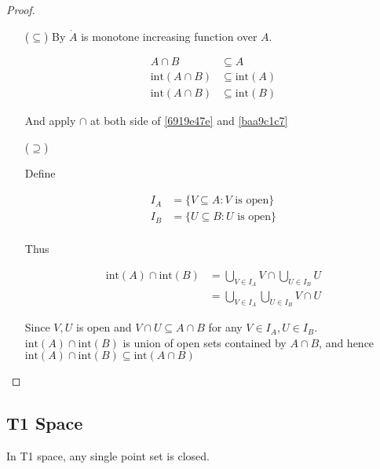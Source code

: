 \begin{proof}
    \:

   \begin{enumerate}
    \item [($\subseteq$)] By $\mathring{A}$ is monotone increasing function over $A$.
    
    \begin{align}
        A \cap B & \subseteq A \\
        \mathrm{int}(A \cap B) & \subseteq \mathrm{int}(A) \label{6919e47e} \\
        \mathrm{int}(A \cap B) & \subseteq \mathrm{int}(B) \label{baa9c1c7}
    \end{align}

    And apply $\cap$ at both side of \eqref{6919e47e} and \eqref{baa9c1c7}

    \item [($\supseteq$)]

    Define

    \begin{align*}
        I_A &= \{V \subseteq A: V \text{ is open} \} \\
        I_B &= \{U \subseteq B: U \text{ is open} \} \\
    \end{align*}

    Thus

    \begin{align*}
        \mathrm{int}(A) \cap \mathrm{int}(B) &= \bigcup_{V \in I_A} V \cap  \bigcup_{U \in I_B} U \\
        &=  \bigcup_{V \in I_A} \bigcup_{U \in I_B} V \cap U
    \end{align*}

    Since $V, U$ is open and $V \cap U \subseteq A \cap B$ for any $V \in I_A, U \in I_B$. $\mathrm{int}(A) \cap \mathrm{int}(B)$
    is union of open sets contained by $A \cap B$, and hence $\mathrm{int}(A) \cap \mathrm{int}(B) \subseteq \mathrm{int}(A \cap B)$
   \end{enumerate} 
\end{proof}

\subsection{T1 Space}

\begin{thm}\label{03f30576}
    In T1 space, any single point set is closed.
\end{thm}

